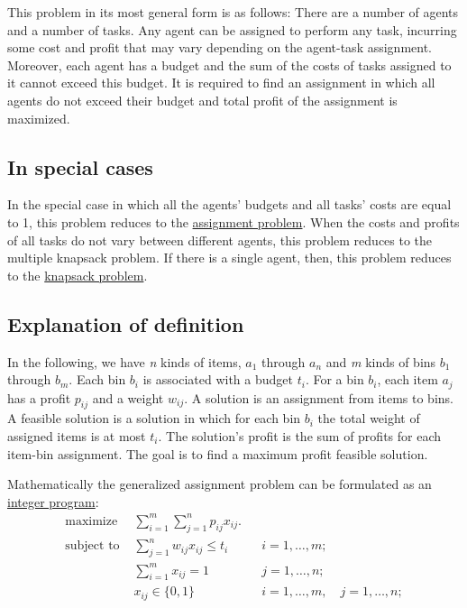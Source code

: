 This problem in its most general form is as follows: There are a number
of agents and a number of tasks. Any agent can be assigned to perform
any task, incurring some cost and profit that may vary depending on the
agent-task assignment. Moreover, each agent has a budget and the sum of
the costs of tasks assigned to it cannot exceed this budget. It is
required to find an assignment in which all agents do not exceed their
budget and total profit of the assignment is maximized.

\hypertarget{in-special-cases}{%
\subsection{In special cases}\label{in-special-cases}}

In the special case in which all the agents' budgets and all tasks'
costs are equal to 1, this problem reduces to the
\href{assignment_problem}{assignment problem}. When the costs and
profits of all tasks do not vary between different agents, this problem
reduces to the multiple knapsack problem. If there is a single agent,
then, this problem reduces to the \href{knapsack_problem}{knapsack
problem}.

\hypertarget{explanation-of-definition}{%
\subsection{Explanation of definition}\label{explanation-of-definition}}

In the following, we have \emph{n} kinds of items, \(a_1\) through
\(a_n\) and \emph{m} kinds of bins \(b_1\) through \(b_m\). Each bin
\(b_i\) is associated with a budget \(t_i\). For a bin \(b_i\), each
item \(a_j\) has a profit \(p_{ij}\) and a weight \(w_{ij}\). A solution
is an assignment from items to bins. A feasible solution is a solution
in which for each bin \(b_i\) the total weight of assigned items is at
most \(t_i\). The solution's profit is the sum of profits for each
item-bin assignment. The goal is to find a maximum profit feasible
solution.

Mathematically the generalized assignment problem can be formulated as
an \href{Integer_programming}{integer program}:
\begin{align} \text{maximize } &
\sum_{i=1}^m\sum_{j=1}^n
p_{ij} x_{ij}. \\
\text{subject to } & \sum_{j=1}^n
w_{ij} x_{ij} \le t_i & & i=1,
\ldots, m; \\ &
\sum_{i=1}^m x_{ij} = 1 & & j=1,
\ldots, n; \\ & x_{ij}
\in \{0,1\} & & i=1,
\ldots, m, \quad j=1,
\ldots, n; \end{align}

